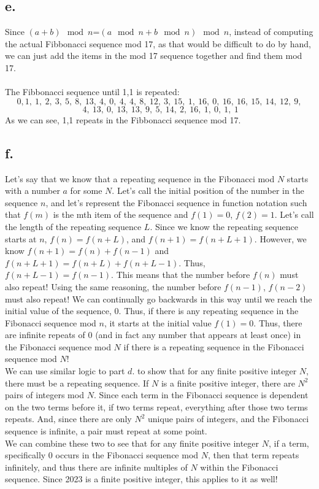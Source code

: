 \documentclass{article}
\begin{document}
\subsection*{e.}
Since ${(a+b) \mod n}$=${({a \mod n} + {b \mod n}) \mod n}$, instead of computing the actual Fibbonacci sequence mod 17, as that would be difficult to do by hand, we can just add the items in the mod 17 sequence together and find them mod 17. 
\\ \\ The Fibbonacci sequence until 1,1 is repeated:
 $$0, 1, \ 1, \ 2, \ 3, \ 5, \ 8, \ 13, \ 4, \ 0,\ 4,\ 4,\ 8,\ 12, \ 3, \ 15,\ 1, \ 16,\ 0,\ 16,\ 16,\ 15,\ 14,\ 12,\ 9, $$ $$\ 4, \ 13, \ 0, \ 13, \ 13, \ 9, \ 5, \ 14, \ 2, \ 16, \ 1, \ 0, \ 1, \ 1$$
 As we can see, 1,1 repeats in the Fibbonacci sequence mod 17. 
 \subsection*{f.}
Let's say that we know that a repeating sequence in the Fibonacci mod $N$ starts with a number $a$ for some $N$. Let's call the initial position of the number in the sequence $n$, and let's represent the Fibonacci sequence in function notation such that $f(m)$ is the mth item of the sequence and $f(1)=0$, $f(2)=1$. Let's call the length of the repeating sequence $L$. Since we know the repeating sequence starts at $n$, $f(n)=f(n+L)$, and $f(n+1)=f(n+L+1)$. However, we know $f(n+1)=f(n)+f(n-1)$ and $f(n+L+1)=f(n+L)+f(n+L-1)$. Thus, $f(n+L-1)=f(n-1)$. This means that the number before $f(n)$ must also repeat! Using the same reasoning, the number before $f(n-1)$, $f(n-2)$ must also repeat! We can continually go backwards in this way until we reach the initial value of the sequence, $0$. Thus, if there is any repeating sequence in the Fibonacci sequence mod $n$, it starts at the initial value $f(1)=0$. Thus, there are infinite repeats of $0$ (and in fact any number that appears at least once) in the Fibonacci sequence mod $N$ if there is a repeating sequence in the Fibonacci sequence mod $N$! 
\\We can use similar logic to part $d.$ to show that for any finite positive integer $N$, there must be a repeating sequence. If $N$ is a finite positive integer, there are $N^2$ pairs of integers mod $N$. Since each term in the Fibonacci sequence is dependent on the two terms before it, if two terms repeat, everything after those two terms repeats. And, since there are only $N^2$ unique pairs of integers, and the Fibonacci sequence is infinite, a pair must repeat at some point. 
\\We can combine these two to see that for any finite positive integer $N$, if a term, specifically $0$ occurs in the Fibonacci sequence mod $N$, then that term repeats infinitely, and thus there are infinite multiples of $N$ within the Fibonacci sequence. Since 2023 is a finite positive integer, this applies to it as well!
\pagebreak
\end{document}
